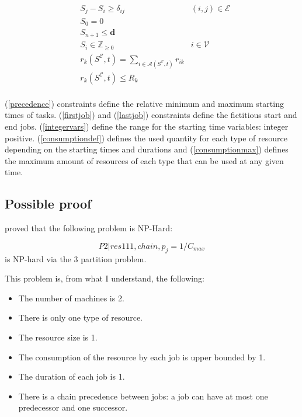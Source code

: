 \documentclass[a4paper,11pt]{article}
\begin{document}
    \begin{align}
        & S_j - S_i \geq \delta_{ij} & (i, j) \in \mathcal{E}  \label{precedence}\\
        & S_0 = 0 &  \label{firstjob}\\
        & S_{n+1} \leq \mathbf{d}   \label{lastjob}\\
        & S_{i} \in \mathbb{Z}_{\geq 0} & i \in \mathcal{V}  \label{integervars}\\
        & r_k(S^{\mathcal{C}}, t) = \sum_{i \in \mathcal{A}(S^{\mathcal{C}}, t)} r_{ik}  \label{consumptiondef}\\
        & r_k(S^{\mathcal{C}}, t) \leq R_k \label{consumptionmax}\\
    \end{align}

    (\ref{precedence}) constraints define the relative minimum and maximum starting times of tasks.
    (\ref{firstjob}) and (\ref{lastjob}) constraints define the fictitious start and end jobs.
    (\ref{integervars}) define the range for the starting time variables: integer positive.
    (\ref{consumptiondef}) defines the used quantity for each type of resource depending on the starting times and durations and (\ref{consumptionmax}) defines the maximum amount of resources of each type that can be used at any given time.

    \subsection{Possible proof}

    \cite{Blazewicz1983} proved that the following problem is NP-Hard:

    $$P2 | res111, chain, p_j = 1 / C_{max}$$ is NP-hard via the 3 partition problem.

    This problem is, from what I understand, the following:

    \begin{itemize}
        \item The number of machines is 2.
        \item There is only one type of resource.
        \item The resource size is 1.
        \item The consumption of the resource by each job is upper bounded by 1.
        \item The duration of each job is 1.
        \item There is a chain precedence between jobs: a job can have at most one predecessor and one successor.
    \end{itemize}
\end{document}
